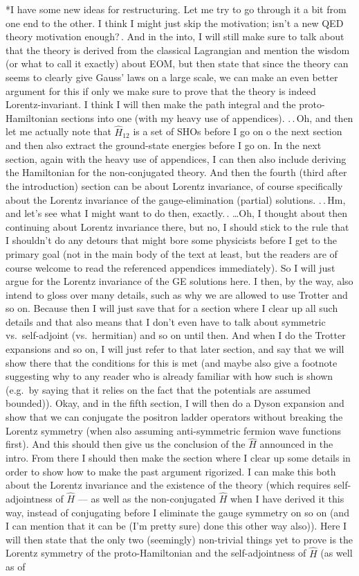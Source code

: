 \documentclass{report}
\begin{document}
*I have some new ideas for restructuring. Let me try to go through it a bit from one end to the other. I think I might just skip the motivation; isn't a new QED theory motivation enough?\,. And in the into, I will still make sure to talk about that the theory is derived from the classical Lagrangian and mention the wisdom (or what to call it exactly) about EOM, but then state that since the theory can seems to clearly give Gauss' laws on a large scale, we can make an even better argument for this if only we make sure to prove that the theory is indeed Lorentz-invariant. I think I will then make the path integral and the proto-Hamiltonian sections into one (with my heavy use of appendices). .\,.\,Oh, and then let me actually note that $\hat H_{12}$ is a set of SHOs before I go on o the next section and then also extract the ground-state energies before I go on. In the next section, again with the heavy use of appendices, I can then also include deriving the Hamiltonian for the non-conjugated theory. And then the fourth (third after the introduction) section can be about Lorentz invariance, of course specifically about the Lorentz invariance of the gauge-elimination (partial) solutions. .\,.\,Hm, and let's see what I might want to do then, exactly.\,. \ldots Oh, I thought about then continuing about Lorentz invariance there, but no, I should stick to the rule that I shouldn't do any detours that might bore some physicists before I get to the primary goal (not in the main body of the text at least, but the readers are of course welcome to read the referenced appendices immediately). So I will just argue for the Lorentz invariance of the GE solutions here. I then, by the way, also intend to gloss over many details, such as why we are allowed to use Trotter and so on. Because then I will just save that for a section where I clear up all such details and that also means that I don't even have to talk about symmetric vs.\ self-adjoint (vs.\ hermitian) and so on until then. And when I do the Trotter expansions and so on, I will just refer to that later section, and say that we will show there that the conditions for this is met (and maybe also give a footnote suggesting why to any reader who is already familiar with how such is shown (e.g.\ by saying that it relies on the fact that the potentials are assumed bounded)). Okay, and in the fifth section, I will then do a Dyson expansion and show that we can conjugate the positron ladder operators without breaking the Lorentz symmetry (when also assuming anti-symmetric fermion wave functions first). And this should then give us the conclusion of the $\hat H$ announced in the intro. From there I should then make the section where I clear up some details in order to show how to make the past argument rigorized. I can make this both about the Lorentz invariance and the existence of the theory (which requires self-adjointness of $\hat H$ --- as well as the non-conjugated $\hat H$ when I have derived it this way, instead of conjugating before I eliminate the gauge symmetry on so on (and I can mention that it can be (I'm pretty sure) done this other way also)). Here I will then state that the only two (seemingly) non-trivial things yet to prove is the Lorentz symmetry of the proto-Hamiltonian and the self-adjointness of $\hat H$ (as well as of 
\end{document}
